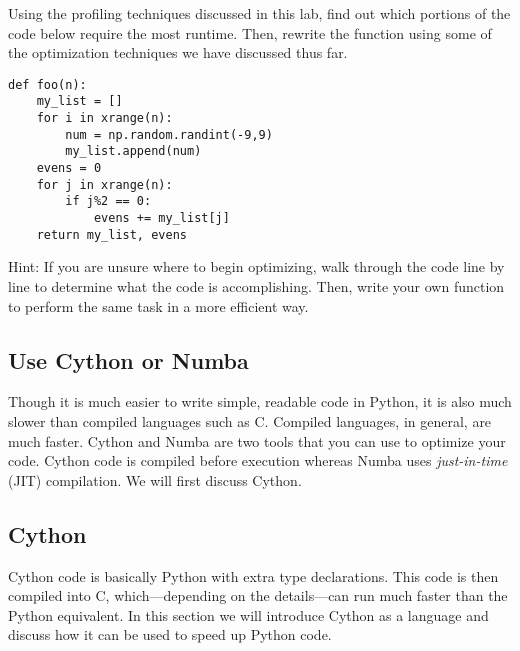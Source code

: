 \begin{problem}
Using the profiling techniques discussed in this lab, find out which portions of the code below require the most runtime. Then, rewrite the function using some of the optimization techniques we have discussed thus far.
\begin{lstlisting}
def foo(n):
    my_list = []
    for i in xrange(n):
        num = np.random.randint(-9,9)
        my_list.append(num)
    evens = 0
    for j in xrange(n):
        if j%2 == 0:
            evens += my_list[j]
    return my_list, evens
\end{lstlisting}

Hint: If you are unsure where to begin optimizing, walk through the code line by line to determine what the code is accomplishing. Then, write your own function to perform the same task in a more efficient way.
\end{problem}


\subsection*{Use Cython or Numba}
Though it is much easier to write simple, readable code in Python, it is also much slower than compiled languages such as C. Compiled languages, in general, are much faster.
Cython and Numba are two tools that you can use to optimize your code. Cython code is compiled before execution whereas Numba uses \emph{just-in-time} (JIT) compilation. We will first discuss Cython.

\subsection*{Cython}
Cython code is basically Python with extra type declarations.
This code is then compiled into C, which---depending on the details---can run much faster than the Python equivalent.
In this section we will introduce Cython as a language and discuss how it can be used to speed up Python code.

